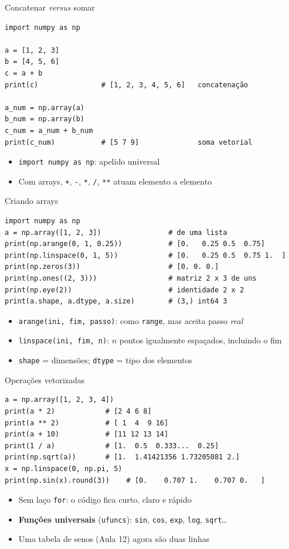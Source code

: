 \documentclass[aspectratio=169,10pt,t]{beamer}
\begin{document}
\begin{frame}[fragile]{Concatenar \emph{versus} somar}
\begin{lstlisting}
import numpy as np

a = [1, 2, 3]
b = [4, 5, 6]
c = a + b
print(c)               # [1, 2, 3, 4, 5, 6]   concatenação

a_num = np.array(a)
b_num = np.array(b)
c_num = a_num + b_num
print(c_num)           # [5 7 9]              soma vetorial
\end{lstlisting}
  \begin{itemize}
    \item \texttt{import numpy as np}: apelido universal
    \item Com arrays, \texttt{+}, \texttt{-}, \texttt{*}, \texttt{/}, \texttt{**} atuam \alert{elemento a elemento}
  \end{itemize}
\end{frame}

\begin{frame}[fragile]{Criando arrays}
\begin{lstlisting}
import numpy as np
a = np.array([1, 2, 3])                # de uma lista
print(np.arange(0, 1, 0.25))           # [0.   0.25 0.5  0.75]
print(np.linspace(0, 1, 5))            # [0.   0.25 0.5  0.75 1.  ]
print(np.zeros(3))                     # [0. 0. 0.]
print(np.ones((2, 3)))                 # matriz 2 x 3 de uns
print(np.eye(2))                       # identidade 2 x 2
print(a.shape, a.dtype, a.size)        # (3,) int64 3
\end{lstlisting}
  \begin{itemize}
    \item \texttt{arange(ini, fim, passo)}: como \texttt{range}, mas aceita passo \emph{real}
    \item \texttt{linspace(ini, fim, n)}: \(n\) pontos igualmente espaçados, \alert{incluindo} o fim
    \item \texttt{shape} = dimensões; \texttt{dtype} = tipo dos elementos
  \end{itemize}
\end{frame}

\begin{frame}[fragile]{Operações vetorizadas}
\begin{lstlisting}
a = np.array([1, 2, 3, 4])
print(a * 2)            # [2 4 6 8]
print(a ** 2)           # [ 1  4  9 16]
print(a + 10)           # [11 12 13 14]
print(1 / a)            # [1.  0.5  0.333...  0.25]
print(np.sqrt(a))       # [1.  1.41421356 1.73205081 2.]
x = np.linspace(0, np.pi, 5)
print(np.sin(x).round(3))    # [0.    0.707 1.    0.707 0.   ]
\end{lstlisting}
  \begin{itemize}
    \item Sem laço \texttt{for}: o código fica curto, claro e rápido
    \item \textbf{Funções universais} (\texttt{ufuncs}): \texttt{sin}, \texttt{cos}, \texttt{exp}, \texttt{log}, \texttt{sqrt}\ldots
    \item Uma tabela de senos (Aula 12) agora são duas linhas
  \end{itemize}
\end{frame}
\end{document}
